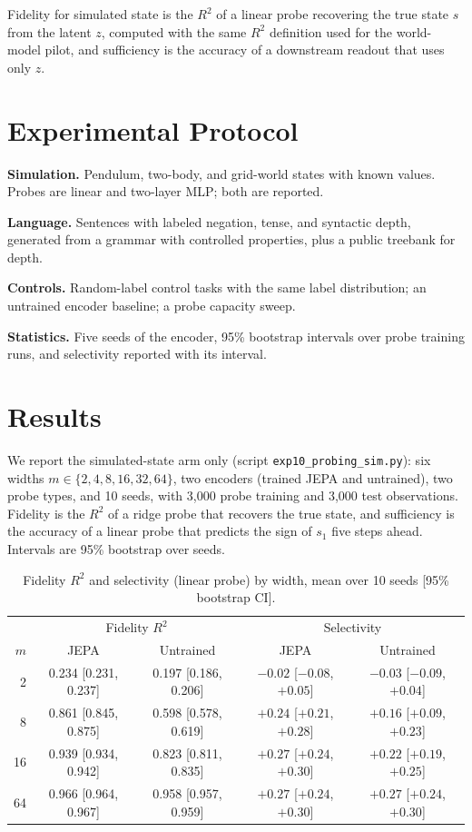 \documentclass[conference]{IEEEtran}
\begin{document}
Fidelity for simulated state is the $R^2$ of a linear probe recovering the true state $s$ from the latent $z$, computed with the same $R^2$ definition used for the world-model pilot, and sufficiency is the accuracy of a downstream readout that uses only $z$.

\section{Experimental Protocol}
\textbf{Simulation.} Pendulum, two-body, and grid-world states with known values. Probes are linear and two-layer MLP; both are reported.

\textbf{Language.} Sentences with labeled negation, tense, and syntactic depth, generated from a grammar with controlled properties, plus a public treebank for depth.

\textbf{Controls.} Random-label control tasks with the same label distribution; an untrained encoder baseline; a probe capacity sweep.

\textbf{Statistics.} Five seeds of the encoder, 95\% bootstrap intervals over probe training runs, and selectivity reported with its interval.

\section{Results}
We report the simulated-state arm only (script \texttt{exp10\_probing\_sim.py}): six widths $m\in\{2,4,8,16,32,64\}$, two encoders (trained JEPA and untrained), two probe types, and 10 seeds, with 3{,}000 probe training and 3{,}000 test observations. Fidelity is the $R^2$ of a ridge probe that recovers the true state, and sufficiency is the accuracy of a linear probe that predicts the sign of $s_1$ five steps ahead. Intervals are 95\% bootstrap over seeds.

\begin{table}[!t]
\caption{Fidelity $R^2$ and selectivity (linear probe) by width, mean over 10 seeds [95\% bootstrap CI].}
\label{tab:probing}
\centering
\small
\small
\begin{tabular}{rcccc}
\hline
 & \multicolumn{2}{c}{Fidelity $R^2$} & \multicolumn{2}{c}{Selectivity} \\
$m$ & JEPA & Untrained & JEPA & Untrained \\
\hline
2  & 0.234 [0.231, 0.237] & 0.197 [0.186, 0.206] & $-0.02$ [$-0.08$, $+0.05$] & $-0.03$ [$-0.09$, $+0.04$] \\
8  & 0.861 [0.845, 0.875] & 0.598 [0.578, 0.619] & $+0.24$ [$+0.21$, $+0.28$] & $+0.16$ [$+0.09$, $+0.23$] \\
16 & 0.939 [0.934, 0.942] & 0.823 [0.811, 0.835] & $+0.27$ [$+0.24$, $+0.30$] & $+0.22$ [$+0.19$, $+0.25$] \\
64 & 0.966 [0.964, 0.967] & 0.958 [0.957, 0.959] & $+0.27$ [$+0.24$, $+0.30$] & $+0.27$ [$+0.24$, $+0.30$] \\
\hline
\end{tabular}
\end{table}
\end{document}
